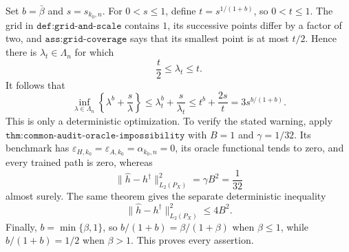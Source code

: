 Set \(b=\bar\beta\) and \(s=s_{k_0,n}\). For \(0<s\le1\), define \(t=s^{1/(1+b)}\), so \(0<t\le1\). The grid in \(\texttt{def:grid-and-scale}\) contains \(1\), its successive points differ by a factor of two, and \(\texttt{ass:grid-coverage}\) says that its smallest point is at most \(t/2\). Hence there is \(\lambda_t\in\Lambda_n\) for which
\[
 \frac{t}{2}\le\lambda_t\le t.
\]
It follows that
\[
 \inf_{\lambda\in\Lambda_n}
 \left\{\lambda^b+\frac{s}{\lambda}\right\}
 \le \lambda_t^b+\frac{s}{\lambda_t}
 \le t^b+\frac{2s}{t}
 =3s^{b/(1+b)}.
\]
This is only a deterministic optimization. To verify the stated warning, apply \(\texttt{thm:common-audit-oracle-impossibility}\) with \(B=1\) and \(\gamma=1/32\). Its benchmark has \(\varepsilon_{H,k_0}=\varepsilon_{A,k_0}=\alpha_{k_0,n}=0\), its oracle functional tends to zero, and every trained path is zero, whereas
\[
 \|\widehat h-h^\dagger\|_{L_2(P_X)}^2
 =\gamma B^2=\frac1{32}
\]
almost surely. The same theorem gives the separate deterministic inequality
\[
 \|\widehat h-h^\dagger\|_{L_2(P_X)}^2\le4B^2.
\]
Finally, \(b=\min\{\beta,1\}\), so \(b/(1+b)=\beta/(1+\beta)\) when \(\beta\le1\), while \(b/(1+b)=1/2\) when \(\beta>1\). This proves every assertion.
